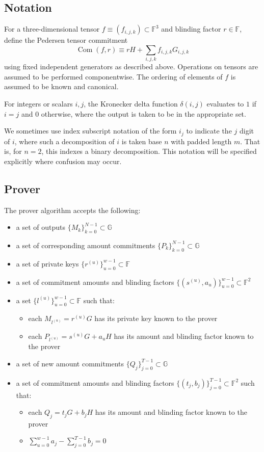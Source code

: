 \documentclass[draft]{article}
\newcommand{\G}{\mathbb{G}}
\newcommand{\F}{\mathbb{F}}
\newcommand{\com}{\operatorname{Com}}
\begin{document}
\subsection{Notation}
For a three-dimensional tensor $f \equiv (f_{i,j,k}) \subset \F^3$ and blinding factor $r \in \F$, define the Pedersen tensor commitment $$\com(f,r) \equiv rH + \sum_{i,j,k} f_{i,j,k} G_{i,j,k}$$ using fixed independent generators as described above. Operations on tensors are assumed to be performed componentwise. The ordering of elements of $f$ is assumed to be known and canonical.

For integers or scalars $i,j$, the Kronecker delta function $\delta(i,j)$ evaluates to $1$ if $i=j$ and $0$ otherwise, where the output is taken to be in the appropriate set.

We sometimes use index subscript notation of the form $i_j$ to indicate the $j$ digit of $i$, where such a decomposition of $i$ is taken base $n$ with padded length $m$. That is, for $n=2$, this indexes a binary decomposition. This notation will be specified explicitly where confusion may occur.


\subsection{Prover}
The prover algorithm accepts the following:
\begin{itemize}
\item a set of outputs $\{M_k\}_{k=0}^{N-1} \subset \G$
\item a set of corresponding amount commitments $\{P_k\}_{k=0}^{N-1} \subset \G$
\item a set of private keys $\{r^{(u)}\}_{u=0}^{w-1} \subset \F$
\item a set of commitment amounts and blinding factors $\{(s^{(u)},a_u)\}_{u=0}^{w-1} \subset \F^2$
\item a set $\{l^{(u)}\}_{u=0}^{w-1} \subset \F$ such that:
\begin{itemize}
\item each $M_{l^{(u)}} = r^{(u)}G$ has its private key known to the prover
\item each $P_{l^{(u)}} = s^{(u)}G + a_uH$ has its amount and blinding factor known to the prover
\end{itemize}
\item a set of new amount commitments $\{Q_j\}_{j=0}^{T-1} \subset \G$
\item a set of commitment amounts and blinding factors $\{(t_j,b_j)\}_{j=0}^{T-1} \subset \F^2$ such that:
\begin{itemize}
\item each $Q_j = t_jG + b_jH$ has its amount and blinding factor known to the prover
\item $\sum_{u=0}^{w-1} a_j - \sum_{j=0}^{T-1} b_j = 0$
\end{itemize}
\end{itemize}
\end{document}
